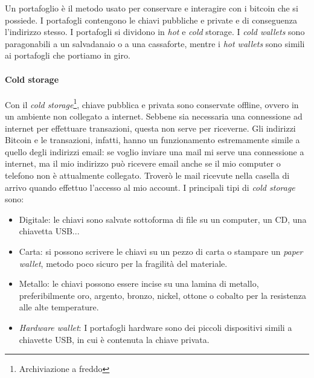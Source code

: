 \documentclass {article}
\begin{document}
Un portafoglio è il metodo usato per conservare e interagire con i bitcoin che si possiede.
I portafogli contengono le chiavi pubbliche e private e di conseguenza l'indirizzo stesso.
I portafogli si dividono in \textit{hot} e \textit{cold} storage.
I \textit{cold wallets} sono paragonabili a un salvadanaio o a una cassaforte, mentre i \textit{hot wallets} sono simili ai portafogli che portiamo in giro.

\paragraph {Cold storage}

Con il \textit{cold storage}\footnote{Archiviazione a freddo}, chiave pubblica e privata sono conservate offline, ovvero in un ambiente non collegato a internet.
Sebbene sia necessaria una connessione ad internet per effettuare transazioni, questa non serve per riceverne.
Gli indirizzi Bitcoin e le transazioni, infatti, hanno un funzionamento estremamente simile a quello degli indirizzi email: se voglio inviare una mail mi serve una connessione a internet, ma il mio indirizzo può ricevere email anche se il mio computer o telefono non è attualmente collegato.
Troverò le mail ricevute nella casella di arrivo quando effettuo l'accesso al mio account.
I principali tipi di \textit{cold storage} sono:

\begin{itemize}
\item Digitale: le chiavi sono salvate sottoforma di file su un computer, un CD, una chiavetta USB...
\item Carta: si possono scrivere le chiavi su un pezzo di carta o stampare un \textit{paper wallet}, metodo poco sicuro per la fragilità del materiale.
\item Metallo: le chiavi possono essere incise su una lamina di metallo, preferibilmente oro, argento, bronzo, nickel, ottone o cobalto per la resistenza alle alte temperature.
\item \textit{Hardware wallet}: I portafogli hardware sono dei piccoli dispositivi simili a chiavette USB, in cui è contenuta la chiave privata.
\end{itemize}
\end{document}
